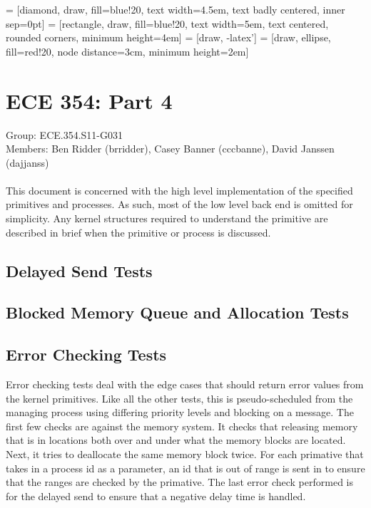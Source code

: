 \documentclass[oneside]{article}
\begin{document}
\lstset{language=C, 
        frame=single, 
        breaklines=true,
        basicstyle=\small\ttfamily,
        columns=fullflexible}

 = [diamond, draw, fill=blue!20, text width=4.5em, text
    badly centered, inner sep=0pt]
 = [rectangle, draw, fill=blue!20, text width=5em, text
    centered, rounded corners, minimum height=4em]
 = [draw, -latex']
 = [draw, ellipse, fill=red!20, node distance=3cm, minimum
    height=2em]

\section*{ECE 354: Part 4}
Group: ECE.354.S11-G031 \\
Members: Ben Ridder (brridder), Casey Banner (cccbanne), 
David Janssen (dajjanss) \\ \\
This document is concerned with the high level implementation of the specified
primitives and processes. As such, most of the low level back end is omitted
for simplicity. Any kernel structures required to understand the primitive are
described in brief when the primitive or process is discussed.

\subsection*{Delayed Send Tests}

\subsection*{Blocked Memory Queue and Allocation Tests}

\subsection*{Error Checking Tests}
Error checking tests deal with the edge cases that should return error values
from the kernel primitives. Like all the other tests, this is pseudo-scheduled
from the managing process using differing priority levels and blocking on a
message. The first few checks are against the memory system. It checks that
releasing memory that is in locations both over and under what the memory
blocks are located. Next, it tries to deallocate the same memory block twice.
For each primative that takes in a process id as a parameter, an id that is out
of range is sent in to ensure that the ranges are checked by the primative. The
last error check performed is for the delayed send to ensure that a negative
delay time is handled.
\end{document}
